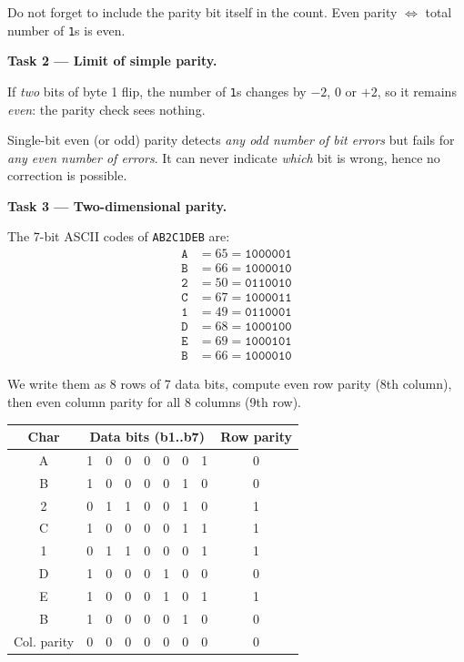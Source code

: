 \documentclass[11pt]{article}
\begin{document}
\begin{attention}
Do not forget to include the parity bit itself in the count. Even parity $\Leftrightarrow$ total number of \texttt{1}s is even.
\end{attention}

\textbf{Task 2 --- Limit of simple parity.}

If \emph{two} bits of byte 1 flip, the number of \texttt{1}s changes by $-2$, $0$ or $+2$, so it remains \emph{even}: the parity check sees nothing. 

\begin{propriete}
Single-bit even (or odd) parity detects \emph{any odd number of bit errors} but fails for \emph{any even number of errors}. It can never indicate \emph{which} bit is wrong, hence no correction is possible.
\end{propriete}

\textbf{Task 3 --- Two-dimensional parity.}

The 7-bit ASCII codes of \texttt{AB2C1DEB} are:
\begin{align*}
\texttt{A} &= 65 = \texttt{1000001} \\
\texttt{B} &= 66 = \texttt{1000010} \\
\texttt{2} &= 50 = \texttt{0110010} \\
\texttt{C} &= 67 = \texttt{1000011} \\
\texttt{1} &= 49 = \texttt{0110001} \\
\texttt{D} &= 68 = \texttt{1000100} \\
\texttt{E} &= 69 = \texttt{1000101} \\
\texttt{B} &= 66 = \texttt{1000010}
\end{align*}

We write them as 8 rows of 7 data bits, compute even row parity (8th column), then even column parity for all 8 columns (9th row).

\begin{center}
\begin{tabular}{|c|ccccccc|c|}
\hline
\rowcolor{popblueL} Char & \multicolumn{7}{c|}{Data bits (b1..b7)} & Row parity \\
\hline
A & 1 & 0 & 0 & 0 & 0 & 0 & 1 & 0 \\
B & 1 & 0 & 0 & 0 & 0 & 1 & 0 & 0 \\
2 & 0 & 1 & 1 & 0 & 0 & 1 & 0 & 1 \\
C & 1 & 0 & 0 & 0 & 0 & 1 & 1 & 1 \\
1 & 0 & 1 & 1 & 0 & 0 & 0 & 1 & 1 \\
D & 1 & 0 & 0 & 0 & 1 & 0 & 0 & 0 \\
E & 1 & 0 & 0 & 0 & 1 & 0 & 1 & 1 \\
B & 1 & 0 & 0 & 0 & 0 & 1 & 0 & 0 \\
\hline
\rowcolor{popblueL} Col. parity & 0 & 0 & 0 & 0 & 0 & 0 & 0 & 0 \\
\hline
\end{tabular}
\end{center}
\end{document}
